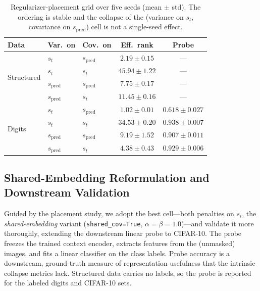 \begin{table}[htbp]
    \centering
    \caption{Regularizer-placement grid over five seeds (mean $\pm$ std). The
    ordering is stable and the collapse of the (variance on $s_t$, covariance
    on $s_{\text{pred}}$) cell is not a single-seed effect.}
    \label{tab:placement_ms}
    \begin{tabular}{lllcc}
        \toprule
        \textbf{Data} & \textbf{Var.\ on} & \textbf{Cov.\ on} &
        \textbf{Eff.\ rank} & \textbf{Probe} \\
        \midrule
        \multirow{4}{*}{Structured}
          & $s_t$          & $s_{\text{pred}}$ & $\mathbf{2.19 \pm 0.15}$ & --- \\
          & $s_t$          & $s_t$             & $45.94 \pm 1.22$ & --- \\
          & $s_{\text{pred}}$ & $s_{\text{pred}}$ & $7.75 \pm 0.17$ & --- \\
          & $s_{\text{pred}}$ & $s_t$          & $11.45 \pm 0.16$ & --- \\
        \midrule
        \multirow{4}{*}{Digits}
          & $s_t$          & $s_{\text{pred}}$ & $\mathbf{1.02 \pm 0.01}$ & $0.618 \pm 0.027$ \\
          & $s_t$          & $s_t$             & $34.53 \pm 0.20$ & $0.938 \pm 0.007$ \\
          & $s_{\text{pred}}$ & $s_{\text{pred}}$ & $9.19 \pm 1.52$ & $0.907 \pm 0.011$ \\
          & $s_{\text{pred}}$ & $s_t$          & $4.38 \pm 0.43$ & $0.929 \pm 0.006$ \\
        \bottomrule
    \end{tabular}
\end{table}

\subsection{Shared-Embedding Reformulation and Downstream Validation}
\label{sec:sharedfix}
Guided by the placement study, we adopt the best cell---both penalties on
$s_t$, the \emph{shared-embedding} variant (\texttt{shared\_cov=True},
$\alpha = \beta = 1.0$)---and validate it more thoroughly, extending the
downstream linear probe to CIFAR-10. The probe freezes the trained context
encoder, extracts features from the (unmasked) images, and fits a linear
classifier on the class labels. Probe accuracy is a downstream, ground-truth measure of representation
usefulness that the intrinsic collapse metrics lack. Structured data carries
no labels, so the probe is reported for the labeled digits and CIFAR-10 sets.

